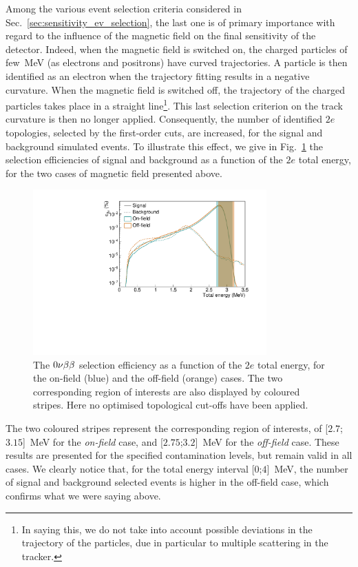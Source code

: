 Among the various event selection criteria considered in Sec.~\ref{sec:sensitivity_ev_selection}, the last one is of primary importance with regard to the influence of the magnetic field on the final sensitivity of the detector.
Indeed, when the magnetic field is switched on, the charged particles of few~MeV (as electrons and positrons) have curved trajectories.
A particle is then identified as an electron when the trajectory fitting results in a negative curvature.
When the magnetic field is switched off, the trajectory of the charged particles takes place in a straight line\footnote{In saying this, we do not take into account possible deviations in the trajectory of the particles, due in particular to multiple scattering in the tracker.}.
This last selection criterion on the track curvature is then no longer applied.
Consequently, the number of identified $2e$ topologies, selected by the first-order cuts, are increased, for the signal and background simulated events.
To illustrate this effect, we give in Fig.~\ref{fig:eff_0nu_w_wo_B} the selection efficiencies of signal and background as a function of the $2e$ total energy, for the two cases of magnetic field presented above.
\begin{figure}[h]
  \centering
  \includegraphics[width=0.8\textwidth]{Sensitivity/fig_sensitivity/Nbkg_field.pdf}
  \caption{The $0\nu\beta\beta$ selection efficiency as a function of the $2e$ total energy, for the on-field (blue) and the off-field (orange) cases.
    The two corresponding region of interests are also displayed by coloured stripes.
    Here no optimised topological cut-offs have been applied.
    \label{fig:eff_0nu_w_wo_B}}
\end{figure}
The two coloured stripes represent the corresponding region of interests, of [$2.7$;$3.15$]~MeV for the \emph{on-field} case, and [$2.75$;$3.2$]~MeV for the \emph{off-field} case.
These results are presented for the specified contamination levels, but remain valid in all cases.
We clearly notice that, for the total energy interval [$0$;$4$]~MeV, the number of signal and background selected events is higher in the off-field case, which confirms what we were saying above.

